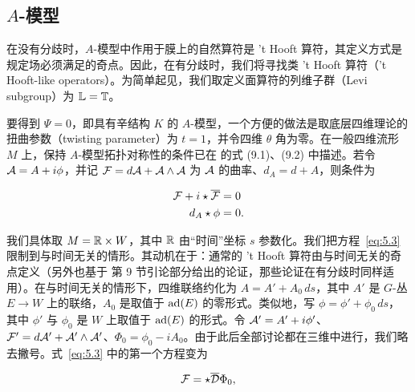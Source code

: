 

\subsection{\texorpdfstring{$A$-模型}{A-模型}}

\label{sec:5.3}

在没有分歧时，$A$-模型中作用于膜上的自然算符是 't Hooft 算符，其定义方式是规定场必须满足的奇点。因此，在有分歧时，我们将寻找类 't Hooft 算符（'t Hooft-like operators）。为简单起见，我们取定义面算符的列维子群（Levi subgroup）为 $\mathbb{L}={\mathbb{T}}$。

要得到 $\Psi=0$，即具有辛结构 $K$ 的 $A$-模型，一个方便的做法是取底层四维理论的扭曲参数（twisting parameter）为 $t=1$，并令四维 $\theta$ 角为零。在一般四维流形 $M$ 上，保持 $A$-模型拓扑对称性的条件已在 \cite{ref8} 的式 (9.1)、(9.2) 中描述。若令 ${\mathcal A}=A+i\phi$，并记 ${\mathcal F}=d{\mathcal A}+{\mathcal A}\wedge {\mathcal A}$ 为 ${\mathcal A}$ 的曲率、$d_A=d+A$，则条件为

\setcounter{equation}{2}
\begin{equation}\label{eq:5.3}
  \begin{aligned}{\mathcal F}+i\star \overline{{\mathcal F}} & = 0\\
                    d_A\star \phi & = 0.\end{aligned}
\end{equation}


我们具体取 $M={\mathbb{R}}\times W$，其中 ${\mathbb{R}}$ 由“时间”坐标 $s$ 参数化。我们把方程~\eqref{eq:5.3} 限制到与时间无关的情形。其动机在于：通常的 't Hooft 算符由与时间无关的奇点定义（另外也基于 \cite{ref8} 第 9 节引论部分给出的论证，那些论证在有分歧时同样适用）。在与时间无关的情形下，四维联络约化为 $A=A'+A_0\,ds$，其中 $A'$ 是 $G$-丛 $E\to W$ 上的联络，$A_0$ 是取值于 ${\rm ad}(E)$ 的零形式。类似地，写 $\phi=\phi'+\phi_0\,ds$，其中 $\phi'$ 与 $\phi_0$ 是 $W$ 上取值于 ${\rm ad}(E)$ 的形式。令 ${\mathcal A}'=A'+i\phi'$、${\mathcal F}'=d{\mathcal A}'+{\mathcal A}'\wedge {\mathcal A}'$、$\Phi_0=\phi_0-iA_0$。由于此后全部讨论都在三维中进行，我们略去撇号。式~\eqref{eq:5.3} 中的第一个方程变为

\setcounter{equation}{3}
\begin{equation}\label{eq:5.4}
  {\mathcal F}=\star\overline {\mathcal D}\Phi_0,
\end{equation}


